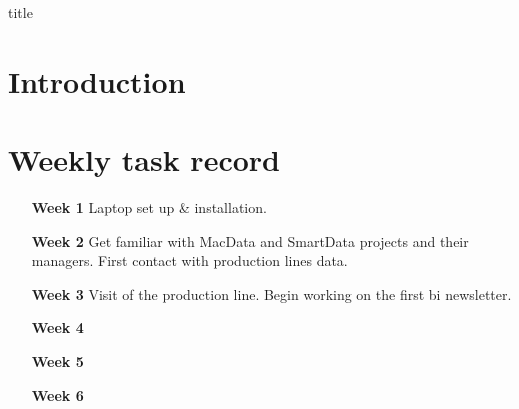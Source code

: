 \documentclass[12pt]{book}
\begin{document}
{title}

\tableofcontents


\chapter{Introduction}


\appendix
\chapter{Weekly task record}
\begin{itemize}
    \item [\textbf{Week 1}] Laptop set up \& installation.
    \item [\textbf{Week 2}] Get familiar with MacData and SmartData projects and their managers. First contact with production lines data.
    \item [\textbf{Week 3}] Visit of the production line. Begin working on the first \gls{bi} newsletter.
    \item [\textbf{Week 4}]
    \item [\textbf{Week 5}]
    \item [\textbf{Week 6}]
\end{itemize}


\end{document}
